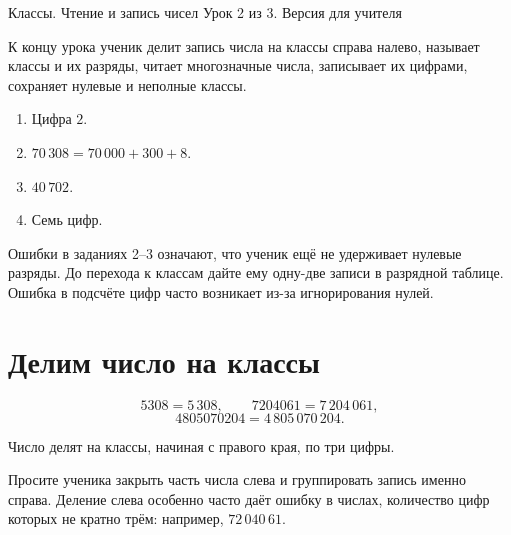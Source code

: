 
\worksheettitle
  {Классы. Чтение и запись чисел}
  {Урок 2 из 3. Версия для учителя}

\begin{teacherbox}
  К концу урока ученик делит запись числа на классы справа налево, называет
  классы и их разряды, читает многозначные числа, записывает их цифрами,
  сохраняет нулевые и неполные классы.
\end{teacherbox}

\begin{checkpointbox}
  \begin{enumerate}[label=\textbf{\arabic*.},itemsep=0.35em]
    \item Цифра \(2\).
    \item \(70\,308=70\,000+300+8\).
    \item \(40\,702\).
    \item Семь цифр.
  \end{enumerate}
\end{checkpointbox}

\begin{teacherbox}
  Ошибки в заданиях 2--3 означают, что ученик ещё не удерживает нулевые
  разряды. До перехода к классам дайте ему одну-две записи в разрядной
  таблице. Ошибка в подсчёте цифр часто возникает из-за игнорирования нулей.
\end{teacherbox}

\section{Делим число на классы}

\[
  5308=5\,308,\qquad
  7204061=7\,204\,061,
\]
\[
  4805070204=4\,805\,070\,204.
\]

\splitclassesfigure

\begin{conclusionbox}
  Число делят на классы, начиная с правого края, по три цифры.
\end{conclusionbox}

\begin{teacherbox}
  Просите ученика закрыть часть числа слева и группировать запись именно
  справа. Деление слева особенно часто даёт ошибку в числах, количество цифр
  которых не кратно трём: например, \(72\,040\,61\).
\end{teacherbox}

